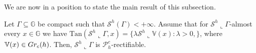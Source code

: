 \documentclass[10pt, a4paper,
oneside, headinclude,footinclude]{scrartcl}
\begin{document}
We are now in a position to state the main result of this subsection.
\begin{teorema}\label{thm:ExistenceOfDensityPlus}
    Let $\Gamma\subseteq \mathbb G$ be compact such that $\mathcal{S}^h(\Gamma)<+\infty$. Assume that for $\mathcal{S}^h\llcorner\Gamma$-almost every $x\in\mathbb G$ we have $\mathrm{Tan}(\mathcal{S}^h\llcorner\Gamma,x)=\{\lambda\mathcal{S}^h\llcorner\mathbb V(x):\lambda>0,\}$, where $\mathbb V(x)\in Gr_c(h)$. Then,  $\mathcal{S}^h\llcorner\Gamma$ is $\mathscr{P}_h^c$-rectifiable.
\end{teorema}
\end{document}
